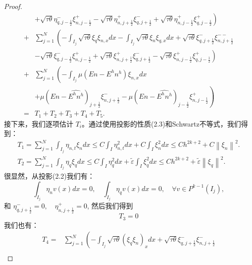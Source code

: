 \begin{proof}
\begin{equation}
\begin{split}
            & \left.+\sqrt{\tau \theta} \eta_{q, j-\frac{1}{2}}^{-} \xi_{n, j-\frac{1}{2}}^{+}-\sqrt{\tau \theta} \eta_{n, j+\frac{1}{2}}^{+} \xi_{q, j+\frac{1}{2}}^{-}+\sqrt{\tau \theta} \eta_{n, j-\frac{1}{2}}^{+} \xi_{q, j-\frac{1}{2}}^{+}\right) \\
            + & \sum_{j=1}^{N}\left(-\int_{I_{j}} \sqrt{\tau \theta} \xi_{q} \xi_{n, x} d x-\int_{I_{j}} \sqrt{\tau \theta} \xi_{n} \xi_{q, x} d x+\sqrt{\tau \theta} \xi_{q, j+\frac{1}{2}}^{-} \xi_{n, j+\frac{1}{2}}^{--}\right. \\
            & \left.-\sqrt{\tau \theta} \xi_{q, j-\frac{1}{2}}^{-} \xi_{n, j-\frac{1}{2}}^{+}+\sqrt{\tau \theta} \xi_{n, j+\frac{1}{2}}^{+} \xi_{q, j+\frac{1}{2}}^{-}-\sqrt{\tau \theta} \xi_{n, j-\frac{1}{2}}^{+} \xi_{q, j-\frac{1}{2}}^{+}\right) \\
            + & \sum_{j=1}^{N}\left(-\int_{I_{j}} \mu\left(E n-E^{h} n^{h}\right) \xi_{n, x} d x\right. \\
            & \left.+\mu\left(E n-\widehat{E^{h} n^{h}}\right)_{j+\frac{1}{2}} \xi_{n, j+\frac{1}{2}}^{-}-\mu\left(E n-\widehat{E^{h} n^{h}}\right)_{j-\frac{1}{2}} \xi_{n, j-\frac{1}{2}}^{+}\right) \\
            = & T_{1}+T_{2}+T_{3}+T_{4}+T_{5} .
        \end{split}
    \end{equation}
    接下来，我们逐项估计 $T_{i}$。通过使用投影的性质(2.3)和Schwartz不等式，我们得到：
    \begin{align}
        T_{1}=\sum_{j=1}^{N} \int_{I_{j}} \eta_{n, t} \xi_{n} d x \leq C \int_{I} \eta_{n, t}^{2} d x+C \int_{I} \xi_{n}^{2} d x \leq C h^{2 k+2}+C\left\|\xi_{n}\right\|^{2} . \\
        T_{2}=\sum_{j=1}^{N} \int_{I_{j}} \eta_{q} \xi_{q} d x \leq C \int_{I} \eta_{q}^{2} d x+\tilde{\varepsilon} \int_{I} \xi_{q}^{2} d x \leq C h^{2 k+2}+\tilde{\varepsilon}\left\|\xi_{q}\right\|^{2} .
    \end{align}
    很显然，从投影(2.2)我们有：
    $$
        \int_{I_{j}} \eta_{n} v(x) d x=0, \quad \int_{I_{j}} \eta_{q} v(x) d x=0, \quad \forall v \in P^{k-1}\left(I_{j}\right),
    $$
    和 $\eta_{q, j+\frac{1}{2}}^{-}=0, \quad \eta_{n, j+\frac{1}{2}}^{+}=0$, 然后我们得到
    \begin{equation}
        T_{3}=0
    \end{equation}
    我们也有：
    \begin{equation}
        \begin{split}
            T_{4}= & \sum_{j=1}^{N}\left(-\int_{I_{j}} \sqrt{\tau \theta}\left(\xi_{q} \xi_{n}\right)_{x} d x+\sqrt{\tau \theta} \xi_{q, j+\frac{1}{2}}^{-} \xi_{n, j+\frac{1}{2}}^{-}\right.                                                                  \\

\end{split}
\end{equation}
\end{proof}
